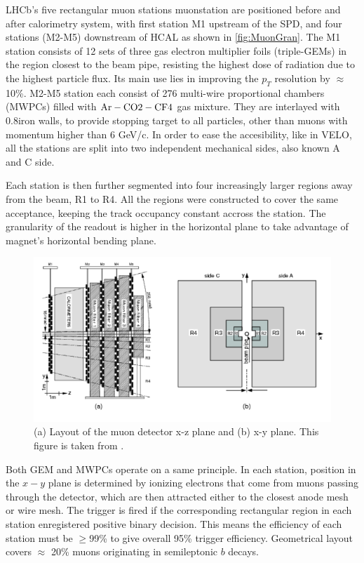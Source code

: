 \Gls{LHCb}'s five rectangular muon stations \Gls{muonstation} are positioned before and after calorimetry system, with first station M1 upstream of the \Gls{SPD}, and four stations (M2-M5) downstream of \Gls{HCAL} as shown in \autoref{fig:MuonGran}. The M1 station consists of 12 sets of three gas electron 
multiplier foils (triple-GEMs) in the region closest to the beam pipe, resisting the highest dose of radiation due to the highest particle flux. Its main use lies in improving the $p_{T}$ resolution by $\approx$ 10\%. M2-M5 station each consist of 276 multi-wire proportional chambers (\Gls{MWPCs}) filled with  $\rm{Ar-CO2-CF4}$ gas mixture. They are interlayed with 0.8\m iron walls, to provide stopping target to all particles, other than muons with momentum higher than $6$ GeV/c. In order to ease the accesibility, like in \Gls{VELO}, all the stations are split into two independent mechanical sides, also known A and C side.

Each station is then further segmented into four increasingly larger regions away from the beam, R1 to R4.
 All the regions were constructed to cover the same acceptance, keeping the track occupancy constant accross the station. The granularity of the readout is higher in the horizontal plane to take advantage of magnet's horizontal bending plane.




\begin{figure}[!h]
	\centering
	\includegraphics[width = 1.0\textwidth]{figs/detector/MuonGran.png}%
	\caption{(a) Layout of the muon detector x-z plane and (b) x-y plane. This figure is taken from \cite{LHCb-DP-2012-002}. }  
	\label{fig:MuonGran}
\end{figure}

Both GEM and \Gls{MWPCs} operate on a same principle. In each station, position in the $x-y$ plane is determined by ionizing electrons that come from muons passing through the detector, which are then attracted either to the closest anode mesh or wire mesh. The trigger is fired if the corresponding rectangular region in each station enregistered positive binary decision. This means the efficiency of each station must be $\geq$99\% to give overall 95\% trigger efficiency. Geometrical layout covers $\approx$ 20\% muons originating in semileptonic $b$ decays.


